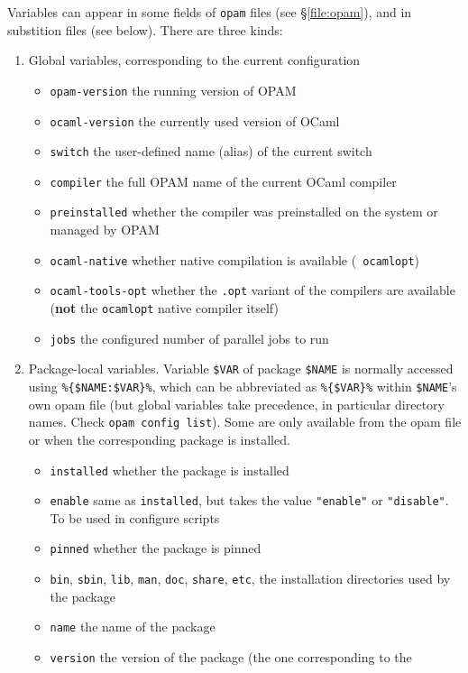 \documentclass[a4paper,10pt]{article}
\begin{document}
Variables can appear in some fields of {\tt opam} files (see \S\ref{file:opam}),
and in substition files (see below). There are three kinds:
\begin{enumerate}
\item Global variables, corresponding to the current configuration
  \begin{itemize}
  \item \verb+opam-version+ the running version of OPAM
  \item \verb+ocaml-version+ the currently used version of OCaml
  \item \verb+switch+ the user-defined name (alias) of the current switch
  \item \verb+compiler+ the full OPAM name of the current OCaml compiler
  \item \verb+preinstalled+ whether the compiler was preinstalled on the system
    or managed by OPAM
  \item \verb+ocaml-native+ whether native compilation is available ({\tt
      ocamlopt})
  \item \verb+ocaml-tools-opt+ whether the {\tt .opt} variant of the
    compilers are available ({\bf not} the {\tt ocamlopt} native compiler itself)
  \item \verb+jobs+ the configured number of parallel jobs to run
  \end{itemize}
\item Package-local variables. Variable \verb+$VAR+ of package \verb+$NAME+ is
  normally accessed using \verb+%{$NAME:$VAR}%+, which can be abbreviated as
  \verb+%{$VAR}%+ within \verb+$NAME+'s own opam file (but global variables take
  precedence, in particular directory names. Check \verb+opam config list+).
  Some are only available from the opam file or when the corresponding package
  is installed.
  \begin{itemize}
  \item \verb+installed+ whether the package is installed
  \item \verb+enable+ same as \verb+installed+, but takes the value
    \verb+"enable"+ or \verb+"disable"+. To be used in configure scripts
  \item \verb+pinned+ whether the package is pinned
  \item \verb+bin+, \verb+sbin+, \verb+lib+, \verb+man+, \verb+doc+,
    \verb+share+, \verb+etc+, the installation directories used by the package
  \item \verb+name+ the name of the package
  \item \verb+version+ the version of the package (the one corresponding to the

\end{itemize}
\end{enumerate}
\end{document}
